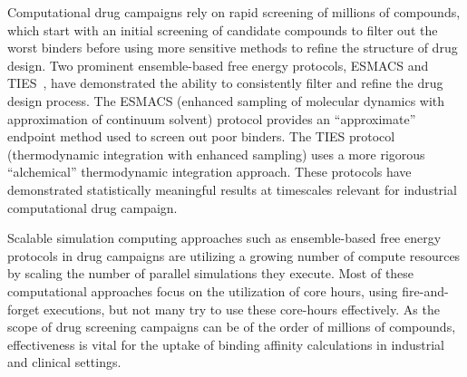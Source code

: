 
Computational drug campaigns rely on rapid screening of millions of
compounds, which start with an initial screening of candidate compounds to
filter out the worst binders before using more sensitive methods to refine
the structure of drug design. Two 
prominent ensemble-based 
free energy protocols, ESMACS and TIES~\cite{Bhati2017}, have demonstrated the 
ability to consistently filter and refine the drug design process. The ESMACS 
(enhanced sampling of molecular dynamics with approximation of continuum solvent)
protocol provides an ``approximate'' endpoint method used to screen out poor
binders. The TIES protocol (thermodynamic integration with enhanced sampling)
uses a more rigorous ``alchemical'' thermodynamic integration approach. These
protocols have demonstrated statistically meaningful results at timescales
relevant for industrial computational drug campaign.


Scalable simulation computing approaches such as ensemble-based free energy
protocols in drug campaigns are utilizing a growing number of compute
resources by scaling the number of parallel simulations they execute. Most of
these computational approaches focus on the utilization of core hours, using
fire-and-forget executions, but not many try to use these core-hours
effectively. As the scope of drug screening campaigns can be of the order of
millions of compounds, effectiveness is vital for the uptake of binding
affinity calculations in industrial and clinical settings. 


 


